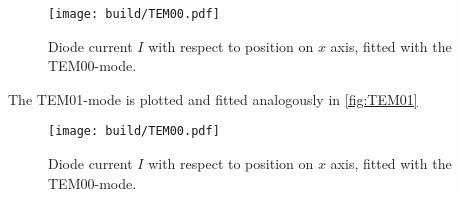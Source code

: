 \begin{figure}
   \centering
   \texttt{[image: build/TEM00.pdf]}
   \caption{Diode current $I$ with respect to position on $x$ axis, fitted with the TEM00-mode.}
   \label{fig:TEM00}
\end{figure}

The TEM01-mode is plotted and fitted analogously in \autoref{fig:TEM01}
\begin{figure}
   \centering
   \texttt{[image: build/TEM00.pdf]}
   \caption{Diode current $I$ with respect to position on $x$ axis, fitted with the TEM00-mode.}
   \label{fig:TEM01}
\end{figure}




